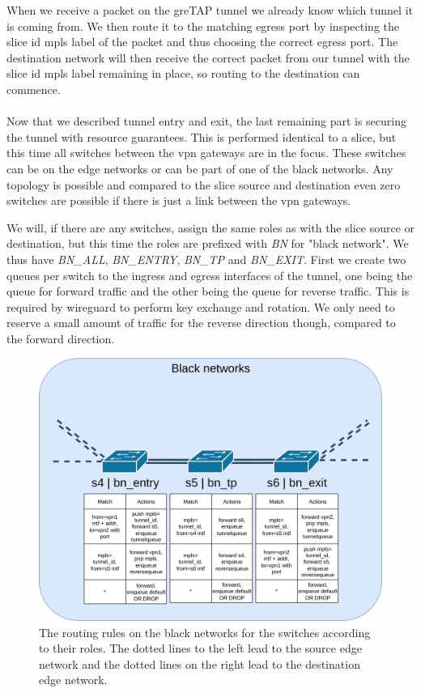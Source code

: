 When we receive a packet on the \acrshort{gre}TAP tunnel we already know which tunnel it is coming from. We then route it to the matching egress port by inspecting the slice id \acrshort{mpls} label of the packet and thus choosing the correct egress port. The destination network will then receive the correct packet from our tunnel with the slice id \acrshort{mpls} label remaining in place, so routing to the destination can commence.

\paragraph{} Now that we described tunnel entry and exit, the last remaining part is securing the tunnel with resource guarantees. This is performed identical to a slice, but this time all switches between the \acrshort{vpn} gateways are in the focus. These switches can be on the edge networks or can be part of one of the black networks. Any topology is possible and compared to the slice source and destination even zero switches are possible if there is just a link between the \acrshort{vpn} gateways.

We will, if there are any switches, assign the same roles as with the slice source or destination, but this time the roles are prefixed with \textit{BN} for "black network". We thus have \textit{BN\_ALL}, \textit{BN\_ENTRY}, \textit{BN\_TP} and \textit{BN\_EXIT}. First we create two queues per switch to the ingress and egress interfaces of the tunnel, one being the queue for forward traffic and the other being the queue for reverse traffic. This is required by wireguard to perform key exchange and rotation. We only need to reserve a small amount of traffic for the reverse direction though, compared to the forward direction.

\begin{figure}[ht]
  \centering
  \includegraphics[width=\linewidth]{images/chapter_6/routing_bn.png}
  \caption[Routing on the black networks]{The routing rules on the black networks for the switches according to their roles. The dotted lines to the left lead to the source edge network and the dotted lines on the right lead to the destination edge network.}
  \label{fig:routing_bn}
\end{figure}

